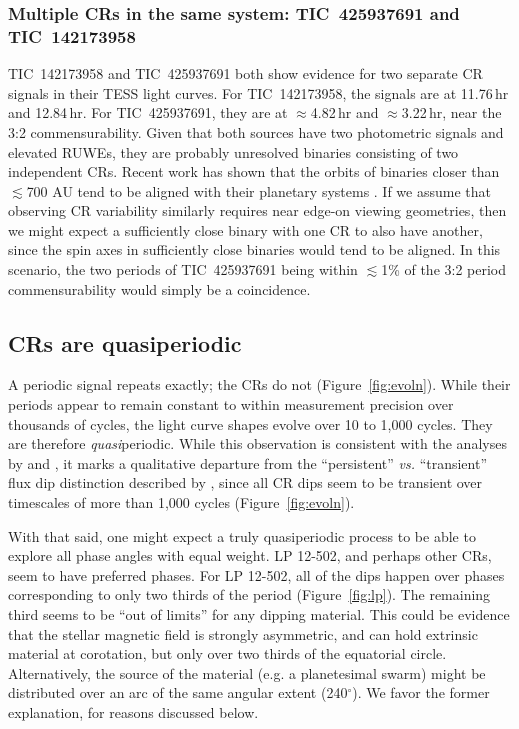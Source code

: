 \documentclass[11pt,twocolumn,tighten]{aastex63}
\begin{document}
\subsubsection{Multiple CRs in the same system: TIC~425937691 and TIC~142173958}

TIC~142173958 and TIC~425937691 both show evidence for two separate
CR signals in their TESS light curves.  For TIC~142173958, the
signals are at 11.76\,hr and 12.84\,hr.  For TIC~425937691, they are
at $\approx$4.82\,hr and $\approx$3.22\,hr, near the 3:2
commensurability.  Given that both sources have two photometric
signals and elevated RUWEs, they are probably unresolved binaries
consisting of two independent CRs.  Recent work has shown that the
orbits of binaries closer than $\lesssim$700 AU tend to be aligned
with their planetary systems \citep[e.g.][]{2022AJ....163..207C}.  If
we assume that observing CR variability similarly requires near
edge-on viewing geometries, then we might expect a sufficiently close
binary with one CR to also have another, since the spin axes in
sufficiently close binaries would tend to be aligned.  In this
scenario, the two periods of TIC~425937691 being within $\lesssim$1\%
of the 3:2 period commensurability would simply be a coincidence.


\subsection{CRs are quasiperiodic}

A periodic signal repeats exactly; the CRs do not
(Figure~\ref{fig:evoln}).  While their periods appear to remain
constant to within measurement precision over thousands of cycles, the
light curve shapes evolve over 10 to 1{,}000 cycles.  They are
therefore {\it quasi}periodic.  While this observation is consistent
with the analyses by \citet{2022AJ....163..144G} and
\citet{2023ApJ...945..114P}, it marks a qualitative departure from the
``persistent'' {\it vs.} ``transient'' flux dip distinction described
by \citet{2017AJ....153..152S}, since all CR dips seem to be
transient over timescales of more than 1{,}000 cycles
(Figure~\ref{fig:evoln}).

With that said, one might expect a truly quasiperiodic process to be
able to explore all phase angles with equal weight.  LP 12-502, and
perhaps other CRs, seem to have preferred phases.  For LP 12-502, all
of the dips happen over phases corresponding to only two thirds of the
period (Figure~\ref{fig:lp}).  The remaining third seems to be ``out
of limits'' for any dipping material.  This could be evidence that the
stellar magnetic field is strongly asymmetric, and can hold extrinsic
material at corotation, but only over two thirds of the equatorial
circle.  Alternatively, the source of the material (e.g. a
planetesimal swarm) might be distributed over an arc of the same
angular extent (240$^\circ$).  We favor the former explanation, for
reasons discussed below.
\end{document}
